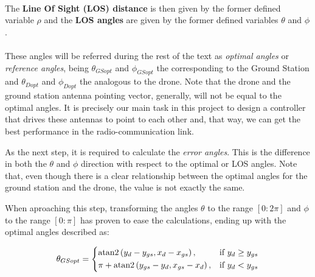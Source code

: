 \paragraph{} The \textbf{Line Of Sight (LOS) distance} is then given by the former defined variable $\rho$ and the \textbf{LOS angles} are given by the former defined variables $\theta$ and $\phi$.
\paragraph{} These angles will be referred during the rest of the text as \textit{optimal angles} or \textit{reference angles}, being $\theta_{GSopt}$ and $\phi_{GSopt}$ the corresponding to the Ground Station and $\theta_{Dopt}$ and $\phi_{Dopt}$ the analogous to the drone.
Note that the drone and the ground station antenna pointing vector, generally, will not be equal to the optimal angles. It is precisely our main task in this project to design a controller that drives these antennas to point to each other and, that way, we can get the best performance in the radio-communication link.


\begin{figure}[H]
   \centering
     
    \label{fig:OptimalAngles1}
\end{figure}

\begin{figure}[H]
   \centering
     
    \label{fig:OptimalAngles2}  
\end{figure}


As the next step, it is required to calculate the \textit{error angles}. This is the difference in both the $\theta$ and $\phi$ direction with respect to the optimal or LOS angles.
Note that, even though there is a clear relationship between the optimal angles for the ground station and the drone, the value is not exactly the same.

When aproaching this step, transforming the angles $\theta$ to the range $[0:2\pi]$ and $\phi$ to the range $[0:\pi]$ has proven to ease the calculations, ending up with the optimal angles described as:

\begin{equation}
  \theta_{GSopt}=
  \begin{dcases}
    {\rm atan2}\left(y_{d}-y_{gs}, x_{d}-x_{gs}\right), & \text{if } y_{d}\geq y_{gs}\\
    \pi + {\rm atan2}\left(y_{gs}-y_{d}, x_{gs}-x_{d}\right), & \text{if } y_{d} < y_{gs}
  \end{dcases}
\end{equation}

